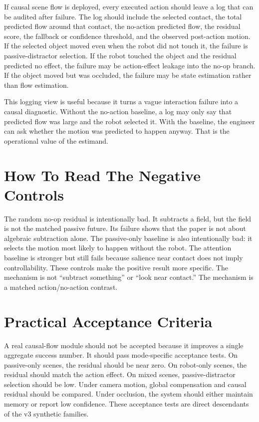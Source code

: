 \documentclass{article}
\begin{document}
If causal scene flow is deployed, every executed action should leave a log that can be
audited after failure.  The log should include the selected contact, the total predicted
flow around that contact, the no-action predicted flow, the residual score, the fallback
or confidence threshold, and the observed post-action motion.  If the selected object
moved even when the robot did not touch it, the failure is passive-distractor selection.
If the robot touched the object and the residual predicted no effect, the failure may be
action-effect leakage into the no-op branch.  If the object moved but was occluded, the
failure may be state estimation rather than flow estimation.

This logging view is useful because it turns a vague interaction failure into a causal
diagnostic.  Without the no-action baseline, a log may only say that predicted flow was
large and the robot selected it.  With the baseline, the engineer can ask whether the
motion was predicted to happen anyway.  That is the operational value of the estimand.

\section{How To Read The Negative Controls}

The random no-op residual is intentionally bad.  It subtracts a field, but the field is
not the matched passive future.  Its failure shows that the paper is not about algebraic
subtraction alone.  The passive-only baseline is also intentionally bad: it selects the
motion most likely to happen without the robot.  The attention baseline is stronger but
still fails because salience near contact does not imply controllability.  These controls
make the positive result more specific.  The mechanism is not ``subtract something'' or
``look near contact.''  The mechanism is a matched action/no-action contrast.

\section{Practical Acceptance Criteria}

A real causal-flow module should not be accepted because it improves a single aggregate
success number.  It should pass mode-specific acceptance tests.  On passive-only scenes,
the residual should be near zero.  On robot-only scenes, the residual should match the
action effect.  On mixed scenes, passive-distractor selection should be low.  Under camera
motion, global compensation and causal residual should be compared.  Under occlusion, the
system should either maintain memory or report low confidence.  These acceptance tests
are direct descendants of the v3 synthetic families.
\end{document}
